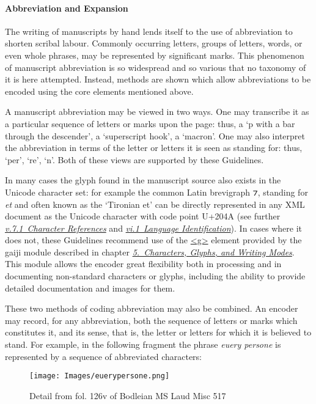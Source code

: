 \paragraph[{Abbreviation and Expansion}]{Abbreviation and Expansion}\label{PHAB}\par
The writing of manuscripts by hand lends itself to the use of abbreviation to shorten scribal labour. Commonly occurring letters, groups of letters, words, or even whole phrases, may be represented by significant marks. This phenomenon of manuscript abbreviation is so widespread and so various that no taxonomy of it is here attempted. Instead, methods are shown which allow abbreviations to be encoded using the core elements mentioned above.\par
A manuscript abbreviation may be viewed in two ways. One may transcribe it as a particular sequence of letters or marks upon the page: thus, a ‘p with a bar through the descender’, a ‘superscript hook’, a ‘macron’. One may also interpret the abbreviation in terms of the letter or letters it is seen as standing for: thus, ‘per’, ‘re’, ‘n’. Both of these views are supported by these Guidelines.\par
In many cases the glyph found in the manuscript source also exists in the Unicode character set: for example the common Latin brevigraph ⁊, standing for \textit{et} and often known as the ‘Tironian et’ can be directly represented in any XML document as the Unicode character with code point U+204A (see further \textit{\hyperref[SG-er]{v.7.1\ Character References}} and \textit{\hyperref[CHSH]{vi.1\ Language Identification}}). In cases where it does not, these Guidelines recommend use of the \hyperref[TEI.g]{<g>} element provided by the \textsf{gaiji} module described in chapter \textit{\hyperref[WD]{5.\ Characters, Glyphs, and Writing Modes}}. This module allows the encoder great flexibility both in processing and in documenting non-standard characters or glyphs, including the ability to provide detailed documentation and images for them.\par
These two methods of coding abbreviation may also be combined. An encoder may record, for any abbreviation, both the sequence of letters or marks which constitutes it, and its sense, that is, the letter or letters for which it is believed to stand. For example, in the following fragment the phrase \textit{euery persone} is represented by a sequence of abbreviated characters: \begin{figure}[htbp]
\noindent\noindent\texttt{[image: Images/euerypersone.png]}
\caption{Detail from fol. 126v of Bodleian MS Laud Misc 517}\end{figure}
